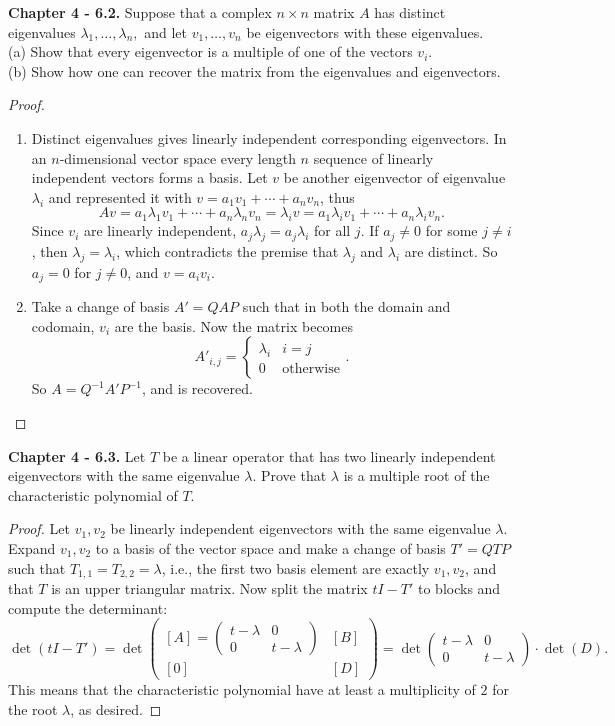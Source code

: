 \documentclass[10pt]{report}
\theoremstyle{definition}
\begin{document}
\textbf{Chapter 4 - 6.2.} Suppose that a complex $n \times n$ matrix $A$ has distinct eigenvalues $\lambda_{1}, \ldots, \lambda_{n},$ and let $v_{1}, \ldots, v_{n}$ be eigenvectors with these eigenvalues.\\
(a) Show that every eigenvector is a multiple of one of the vectors $v_{i}$.\\
(b) Show how one can recover the matrix from the eigenvalues and eigenvectors.
\begin{proof}{}\leavevmode{}
\begin{enumerate}[label=(\alph*)]
\item
Distinct eigenvalues gives linearly independent corresponding eigenvectors. In an $n$-dimensional vector space every length $n$ sequence of linearly independent vectors forms a basis. Let $v$ be another eigenvector of eigenvalue $\lambda_i$ and represented it with $v=a_1v_1+\cdots+a_nv_n$, thus
$$Av=a_1\lambda_1v_1+\cdots+a_n\lambda_nv_n=\lambda_iv=a_1\lambda_iv_1+\cdots+a_n\lambda_iv_n.$$
Since $v_i$ are linearly independent, $a_j\lambda_j=a_j\lambda_i$ for all $j$. If $a_j\neq0$ for some $j\neq i$, then $\lambda_j=\lambda_i$, which contradicts the premise that $\lambda_j$ and $\lambda_i$ are distinct. So $a_j=0$ for $j\neq0$, and $v=a_iv_i$.
\item
Take a change of basis $A'=QAP$ such that in both the domain and codomain, $v_i$ are the basis. Now the matrix becomes
$$A'_{i,j}=\begin{cases}\lambda_i&i=j\\0&\mbox{otherwise}\end{cases}.$$
So $A=Q^{-1}A'P^{-1}$, and is recovered.
\end{enumerate}
\end{proof}

\textbf{Chapter 4 - 6.3.} Let $T$ be a linear operator that has two linearly independent eigenvectors with the same eigenvalue $\lambda .$ Prove that $\lambda$ is a multiple root of the characteristic polynomial of $T .$
\begin{proof}
Let $v_1,v_2$ be linearly independent eigenvectors with the same eigenvalue $\lambda$. Expand $v_1,v_2$ to a basis of the vector space and make a change of basis $T'=QTP$ such that $T_{1,1}=T_{2,2}=\lambda$, i.e., the first two basis element are exactly $v_1,v_2$, and that $T$ is an upper triangular matrix. Now split the matrix $tI-T'$ to blocks and compute the determinant:
$$\det (tI-T')=\det\begin{pmatrix}[A]=\begin{pmatrix}t-\lambda&0\\0&t-\lambda\end{pmatrix}&[B]\\ [0]&[D]\end{pmatrix}=\det\begin{pmatrix}t-\lambda&0\\0&t-\lambda\end{pmatrix}\cdot\det(D).$$
This means that the characteristic polynomial have at least a multiplicity of $2$ for the root $\lambda$, as desired.
\end{proof}
\end{document}
